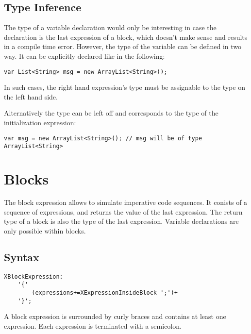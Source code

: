 \documentclass[a4paper,10pt]{scrreprt}
\begin{document}
\subsection{Type Inference}

The type of a variable declaration would only be interesting in case the declaration is the last expression of a block, which doesn't make sense and results in a compile time error.
However, the type of the variable can be defined in two way. It can be explicitly declared like in the following:
\begin{lstlisting}
var List<String> msg = new ArrayList<String>(); 

\end{lstlisting}

In such cases, the right hand expression's type must be assignable to the type on the left hand side. 

Alternatively the type can be left off and corresponds to the type of the initialization expression:  
\begin{lstlisting}
var msg = new ArrayList<String>(); // msg will be of type ArrayList<String>  

\end{lstlisting}







\section{Blocks}
\label{Blocks}
The block expression allows to simulate imperative code sequences. It conists of a sequence of expressions, and returns the value of the last expression.
The return type of a block is also the type of the last expression. 
Variable declarations are only possible within blocks.

\subsection{Syntax}

\begin{lstlisting}
XBlockExpression:
	'{'
		(expressions+=XExpressionInsideBlock ';')+
	'}';

\end{lstlisting}
 

A block expression is surrounded by curly braces and contains at least one expression. Each expression is terminated with a semicolon.
\end{document}
